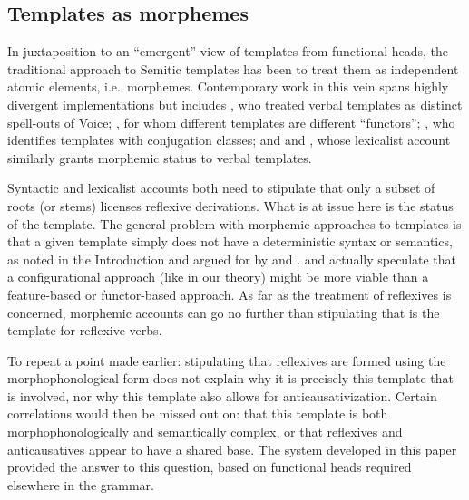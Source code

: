 	\subsection{Templates as morphemes} \label{vz:others:morph}
In juxtaposition to an ``emergent'' view of templates from functional heads, the traditional approach to Semitic templates has been to treat them as independent atomic elements, i.e.~morphemes. Contemporary work in this vein spans highly divergent implementations but includes \cite{arad03,arad05}, who treated verbal templates as distinct spell-outs of Voice; \cite{borer13oup}, for whom different templates are different ``functors''; \cite{aronoff94,aronoff07}, who identifies templates with conjugation classes; and \cite{reinhartsiloni05} and \cite{laks11,laks14}, whose lexicalist account similarly grants morphemic status to verbal templates.

Syntactic and lexicalist accounts both need to stipulate that only a subset of roots (or stems) licenses reflexive derivations. What is at issue here is the status of the template. The general problem with morphemic approaches to templates is that a given template simply does not have a deterministic syntax or semantics, as noted in the Introduction and argued for by \cite{doron03} and \cite{kastner16phd}. \citet[198]{arad05} and \citet[564]{borer13oup} actually speculate that a configurational approach (like in our theory) might be more viable than a feature-based or functor-based approach. As far as the treatment of reflexives is concerned, morphemic accounts can go no further than stipulating that {\thit} is the template for reflexive verbs.

To repeat a point made earlier: stipulating that reflexives are formed using the morphophonological form {\thit} does not explain why it is precisely this template that is involved, nor why this template also allows for anticausativization. Certain correlations would then be missed out on: that this template is both morphophonologically and semantically complex, or that reflexives and anticausatives appear to have a shared base. The system developed in this paper provided the answer to this question, based on functional heads required elsewhere in the grammar.





